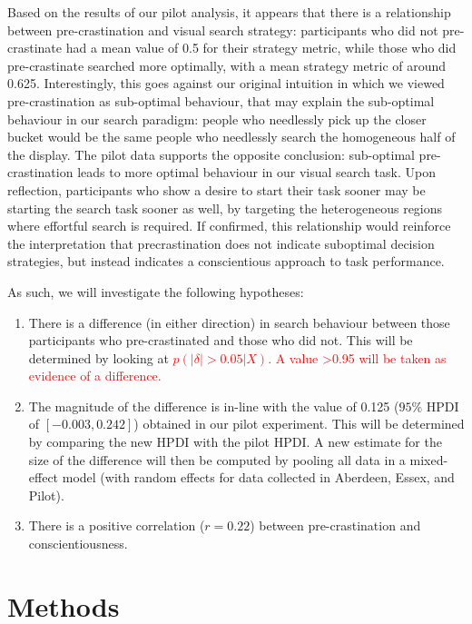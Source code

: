 \documentclass[]{rsos}
\begin{document}
Based on the results of our pilot analysis, it appears that there is a relationship between pre-crastination and visual search strategy: participants who did not pre-crastinate had a mean value of 0.5 for their strategy metric, while those who did pre-crastinate searched more optimally, with a mean strategy metric of around 0.625. Interestingly, this goes against our original intuition in which we viewed pre-crastination as sub-optimal behaviour, that may explain the sub-optimal behaviour in our search paradigm: people who needlessly pick up the closer bucket would be the same people who needlessly search the homogeneous half of the display. The pilot data supports the opposite conclusion: sub-optimal pre-crastination leads to more optimal behaviour in our visual search task. Upon reflection, participants who show a desire to start their task sooner may be starting the search task sooner as well, by targeting the heterogeneous regions where effortful search is required. If confirmed, this relationship would reinforce the interpretation that precrastination does not indicate suboptimal decision strategies, but instead indicates a conscientious approach to task performance.

As such, we will investigate the following hypotheses:

\begin{enumerate}
\item There is a difference (in either direction) in search behaviour between those participants who pre-crastinated and those who did not. This will be determined by looking at \textcolor{red}{$p(\lvert \delta \rvert >0.05 | X)$. A value >0.95 will be taken as evidence of a difference.} 
\item The magnitude of the difference is in-line with the value of 0.125 ($95\%$ HPDI of $[-0.003, 0.242]$) obtained in our pilot experiment. This will be determined by comparing the new HPDI with the pilot HPDI. A new estimate for the size of the difference will then be computed by pooling all data in a mixed-effect model (with random effects for data collected in Aberdeen, Essex, and Pilot).
\item There is a positive correlation ($r=0.22$) between pre-crastination and conscientiousness.
\end{enumerate}

\section{Methods}
\end{document}
